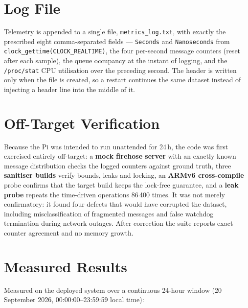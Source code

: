 \documentclass[11pt,a4paper]{article}
\newcommand{\code}[1]{\texttt{\small #1}}
\begin{document}
\section{Log File}

Telemetry is appended to a single file, \code{metrics\_log.txt}, with exactly the
prescribed eight comma-separated fields --- \code{Seconds} and \code{Nanoseconds}
from \code{clock\_gettime(CLOCK\_REALTIME)}, the four per-second message counters
(reset after each sample), the queue occupancy at the instant of logging, and the
\code{/proc/stat} CPU utilisation over the preceding second. The header is written
only when the file is created, so a restart continues the same dataset instead of
injecting a header line into the middle of it.

\section{Off-Target Verification}
\label{sec:verify}

Because the Pi was intended to run unattended for 24\,h, the code was first exercised
entirely off-target: a \textbf{mock firehose server} with an exactly known message
distribution checks the logged counters against ground truth, three \textbf{sanitiser
builds} verify bounds, leaks and locking, an \textbf{ARMv6 cross-compile} probe
confirms that the target build keeps the lock-free guarantee, and a \textbf{leak probe}
repeats the time-driven operations 86\,400 times. It was not merely confirmatory: it
found four defects that would have corrupted the dataset, including misclassification
of fragmented messages and false watchdog termination during network outages. After
correction the suite reports exact counter agreement and no memory growth.

\section{Measured Results}

Measured on the deployed system over a continuous 24-hour window
(20 September 2026, 00:00:00--23:59:59 local time):
\end{document}
